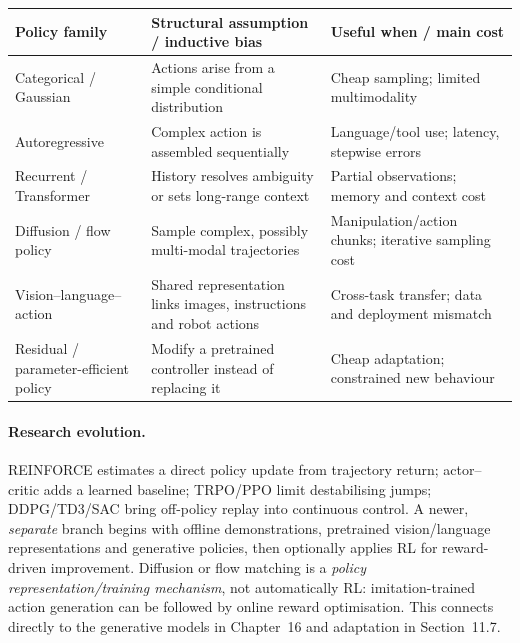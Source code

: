\begin{center}\begingroup\footnotesize\setlength{\tabcolsep}{3pt}
\begin{tabular}{|p{.22\linewidth}|p{.36\linewidth}|p{.33\linewidth}|}\hline
\textbf{Policy family} & \textbf{Structural assumption / inductive bias} & \textbf{Useful when / main cost}\\ \hline
Categorical / Gaussian & Actions arise from a simple conditional distribution & Cheap sampling; limited multimodality\\ \hline
Autoregressive & Complex action is assembled sequentially & Language/tool use; latency, stepwise errors\\ \hline
Recurrent / Transformer & History resolves ambiguity or sets long-range context & Partial observations; memory and context cost\\ \hline
Diffusion / flow policy & Sample complex, possibly multi-modal trajectories & Manipulation/action chunks; iterative sampling cost\\ \hline
Vision--language--action & Shared representation links images, instructions and robot actions & Cross-task transfer; data and deployment mismatch\\ \hline
Residual / parameter-efficient policy & Modify a pretrained controller instead of replacing it & Cheap adaptation; constrained new behaviour\\ \hline
\end{tabular}\endgroup\end{center}
\paragraph{Research evolution.}
REINFORCE estimates a direct policy update from trajectory return; actor--critic adds a learned baseline; TRPO/PPO limit destabilising jumps; DDPG/TD3/SAC bring off-policy replay into continuous control.
A newer, \emph{separate} branch begins with offline demonstrations, pretrained vision/language representations and generative policies, then optionally applies RL for reward-driven improvement.
Diffusion or flow matching is a \emph{policy representation/training mechanism}, not automatically RL: imitation-trained action generation can be followed by online reward optimisation.
This connects directly to the generative models in Chapter~16 and adaptation in Section~11.7.

